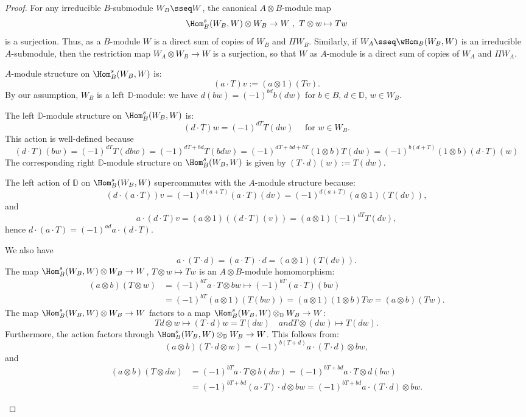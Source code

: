 \documentclass[12pt]{amsart}
\begin{document}
\begin{proof}
For any irreducible $B$-submodule $W_B\sseq W$, the canonical $A\otimes B$-module map 
\[\Hom^s_B(W_B,W)\otimes W_B\to W\ ,\ T\otimes w\mapsto Tw\] 
is a surjection. Thus, as a $B$-module $W$ is a direct sum of copies of $W_B$ and $\Pi W_B$. 
Similarly, if $W_A\sseq \wHom_B(W_B,W)$ is an irreducible $A$-submodule, then the restriction map $W_A\otimes W_B \to W$ is a surjection, so that $W$ as $A$-module is a direct sum of copies of $W_A$ and $\Pi W_A$.




\begin{details}
$A$-module structure on $\Hom^s_B(W_B,W)$ is:
\[
(a\cdot T)v:=(a\otimes 1)(Tv).
\]
By our assumption, $W_B$ is a left $\mathbb D$-module:  we have $d(bw)=(-1)^{bd}b(dw)$ for $b\in B$, $d\in \mathbb D$, $w\in W_B$.

The left $\mathbb D$-module structure on $\Hom^s_B(W_B,W)$ is: 
\[
(d\cdot T)w=(-1)^{dT}T(dw)\quad\text{ for }w\in W_B.
\]
This action is well-defined because
\[
(d\cdot T)(bw)=(-1)^{dT}T(dbw)=(-1)^{dT+bd}T(bdw)=(-1)^{dT+bd+bT}(1\otimes b)T(dw)=(-1)^{b(d+T)}(1\otimes b)(d\cdot T)(w)
\]
The corresponding right $\mathbb D$-module structure on $\Hom^s_B(W_B,W)$ is given by $(T\cdot d)(w):=T(dw)$.

The left action of $\mathbb D$ on $\Hom^s_B(W_B,W)$ supercommutes with the $A$-module structure because:
\[
(d\cdot (a\cdot T))v=(-1)^{d(a+T)}(a\cdot T)(dv)=
(-1)^{d(a+T)}(a\otimes 1)(T(dv)),\]
and
\[
a\cdot (d\cdot T)v=(a\otimes 1)((d\cdot T)(v))=(a\otimes 1)(-1)^{dT}T(dv),
\]
hence $d\cdot (a\cdot T)=(-1)^{ad}a\cdot (d\cdot T)$.

We also have 
\[
a\cdot (T\cdot d)=(a\cdot T)\cdot d=(a\otimes 1)(T(dv)).
\]
The map $\Hom^s_B(W_B,W)\otimes W_B\to W$, $T\otimes w\mapsto Tw$ is an $A\otimes B$-module homomorphism:
\begin{align*}
(a\otimes b)(T\otimes w)&=(-1)^{bT}a\cdot T\otimes bw\mapsto (-1)^{bT}(a\cdot T)(bw)\\
&=(-1)^{bT}(a\otimes 1)(T(bw))=(a\otimes 1)(1\otimes b)Tw=(a\otimes b)(Tw).
\end{align*}
The map $\Hom^s_B(W_B,W)\otimes W_B\to W$ factors to a map
$\Hom^s_B(W_B,W)\otimes_\mathbb D W_B\to W$:
\[
Td\otimes w\mapsto (T\cdot d)w=T(dw)\quad{ and }
T\otimes (dw)\mapsto T(dw).
\]
Furthermore, the action factors through $\Hom^s_B(W_B,W)\otimes_{\mathbb D} W_B\to W$. This follows from:
\[
(a\otimes b)(T\cdot  d\otimes w)=(-1)^{b(T+d)}a\cdot (T\cdot d)\otimes bw,
\]
and 
\begin{align*}
(a\otimes b)(T\otimes dw)&=(-1)^{bT}a\cdot T\otimes b(dw)=
(-1)^{bT+bd}a\cdot T \otimes d(bw)\\&
=
(-1)^{bT+bd}(a\cdot T)\cdot d \otimes bw
=
(-1)^{bT+bd}a\cdot (T\cdot d) \otimes bw.
\end{align*}
\end{details}



\end{proof}
\end{document}
